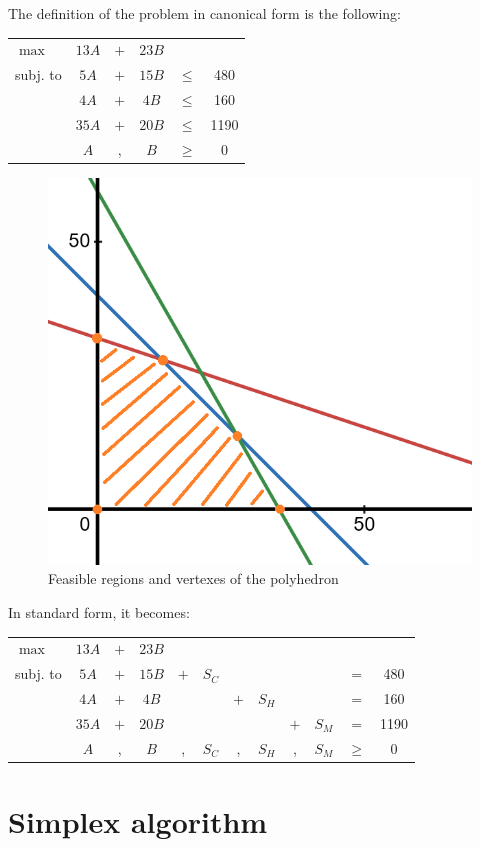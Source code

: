 \begin{example}
    The definition of the problem in canonical form is the following:
    \begin{center}
        \begin{tabular}{lccccc}
            $\max$ & $13A$ & $+$ & $23B$ \\
            subj. to & $5A$ & $+$ & $15B$ & $\leq$ & 480 \\
                & $4A$ & $+$ & $4B$ & $\leq$ & 160 \\
                & $35A$ & $+$ & $20B$ & $\leq$ & 1190 \\
                & $A$ & , & $B$ & $\geq$ & 0 \\
        \end{tabular}
    \end{center}

    \begin{figure}[H]
        \centering
        \includegraphics[width=0.3\linewidth]{./img/lp_brewery_problem.png}
        \caption{Feasible regions and vertexes of the polyhedron}
    \end{figure}

    In standard form, it becomes:
    \begin{center}
        \begin{tabular}{lccccccccccc}
            $\max$ & $13A$ & $+$ & $23B$ \\
            subj. to & $5A$ & $+$ & $15B$ & $+$ & $S_C$ & & & & & $=$ & 480 \\
                & $4A$ & $+$ & $4B$ & & & $+$ & $S_H$ & & & $=$ & 160 \\
                & $35A$ & $+$ & $20B$ & & & & & $+$ & $S_M$ & $=$ & 1190 \\
                & $A$ & , & $B$ & , & $S_C$ & , & $S_H$ & , & $S_M$ & $\geq$ & 0 \\
        \end{tabular}
    \end{center}
\end{example}



\section{Simplex algorithm}

